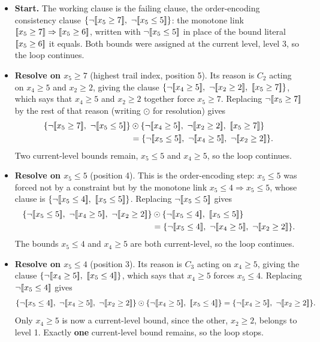 \begin{itemize}
  \item \textbf{Start.} The working clause is the failing clause, the order-encoding
  consistency clause $\{\lnot[\![x_5 \ge 7]\!],\ \lnot[\![x_5
  \le 5]\!]\}$: the monotone link $[\![x_5 \ge 7]\!]
  \Rightarrow [\![x_5 \ge 6]\!]$, written with $\lnot[\![x_5
  \le 5]\!]$ in place of the bound literal $[\![x_5 \ge 6]\!]$ it
  equals. Both bounds were assigned at the current level, level 3, so the loop
  continues.
  \item \textbf{Resolve on $x_5 \ge 7$} (highest trail index, position 5). Its
  reason is $C_2$ acting on $x_4 \ge 5$ and $x_2 \ge 2$, giving the clause
  $\{\lnot\bl{x_4 \ge 5},\ \lnot\bl{x_2 \ge 2},\
  \bl{x_5 \ge 7}\}$, which says that $x_4 \ge 5$ and $x_2 \ge 2$
  together force $x_5 \ge 7$. Replacing $\lnot[\![x_5 \ge 7]\!]$ by
  the rest of that reason (writing $\odot$ for resolution) gives
  \[
    \begin{aligned}
    \{\lnot\bl{x_5 \ge 7},\ \lnot\bl{x_5 \le 5}\}
    &\odot
    \{\lnot\bl{x_4 \ge 5},\ \lnot\bl{x_2 \ge 2},\
      \bl{x_5 \ge 7}\} \\
    &= \{\lnot\bl{x_5 \le 5},\ \lnot\bl{x_4 \ge 5},\ \lnot\bl{x_2 \ge 2}\}.
    \end{aligned}
  \]
  Two current-level bounds remain, $x_5 \le 5$ and $x_4 \ge 5$, so the loop
  continues.
  \item \textbf{Resolve on $x_5 \le 5$} (position 4). This is the order-encoding
  step: $x_5 \le 5$ was forced not by a constraint but by the monotone link
  $x_5 \le 4 \Rightarrow x_5 \le 5$, whose clause is $\{\lnot\bl{x_5 \le 4},\ \bl{x_5 \le 5}\}$. Replacing $\lnot[\![x_5
  \le 5]\!]$ gives
  \[
    \begin{aligned}
    \{\lnot\bl{x_5 \le 5},\ \lnot\bl{x_4 \ge 5},\
      \lnot\bl{x_2 \ge 2}\}
    &\odot
    \{\lnot\bl{x_5 \le 4},\ \bl{x_5 \le 5}\} \\
    &= \{\lnot\bl{x_5 \le 4},\ \lnot\bl{x_4 \ge 5},\ \lnot\bl{x_2 \ge 2}\}.
    \end{aligned}
  \]
  The bounds $x_5 \le 4$ and $x_4 \ge 5$ are both current-level, so the loop
  continues.
  \item \textbf{Resolve on $x_5 \le 4$} (position 3). Its reason is $C_3$ acting on
  $x_4 \ge 5$, giving the clause $\{\lnot[\![x_4 \ge 5]\!],\
  [\![x_5 \le 4]\!]\}$, which says that $x_4 \ge 5$ forces
  $x_5 \le 4$. Replacing $\lnot[\![x_5 \le 4]\!]$ gives
  \[
    \{\lnot\bl{x_5 \le 4},\ \lnot\bl{x_4 \ge 5},\
      \lnot\bl{x_2 \ge 2}\}
    \odot
    \{\lnot\bl{x_4 \ge 5},\ \bl{x_5 \le 4}\}
    = \{\lnot\bl{x_4 \ge 5},\ \lnot\bl{x_2 \ge 2}\}.
  \]
  Only $x_4 \ge 5$ is now a current-level bound, since the other, $x_2 \ge 2$,
  belongs to level 1. Exactly \textbf{one} current-level bound remains, so the
  loop stops.
\end{itemize}

